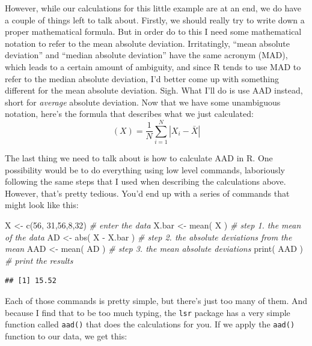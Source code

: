 \documentclass[
]{book}
\newenvironment{Shaded}{\begin{snugshade}}{\end{snugshade}}
\newcommand{\CommentTok}[1]{\textcolor[rgb]{0.56,0.35,0.01}{\textit{#1}}}
\newcommand{\DecValTok}[1]{\textcolor[rgb]{0.00,0.00,0.81}{#1}}
\newcommand{\FunctionTok}[1]{\textcolor[rgb]{0.00,0.00,0.00}{#1}}
\newcommand{\NormalTok}[1]{#1}
\newcommand{\OtherTok}[1]{\textcolor[rgb]{0.56,0.35,0.01}{#1}}
\newcommand{\SpecialCharTok}[1]{\textcolor[rgb]{0.00,0.00,0.00}{#1}}
\begin{document}
However, while our calculations for this little example are at an end, we do have a couple of things left to talk about. Firstly, we should really try to write down a proper mathematical formula. But in order do to this I need some mathematical notation to refer to the mean absolute deviation. Irritatingly, ``mean absolute deviation'' and ``median absolute deviation'' have the same acronym (MAD), which leads to a certain amount of ambiguity, and since R tends to use MAD to refer to the median absolute deviation, I'd better come up with something different for the mean absolute deviation. Sigh. What I'll do is use AAD instead, short for \emph{average} absolute deviation. Now that we have some unambiguous notation, here's the formula that describes what we just calculated:
\[
\mbox{}(X) = \frac{1}{N} \sum_{i = 1}^N |X_i - \bar{X}|
\]

The last thing we need to talk about is how to calculate AAD in R. One possibility would be to do everything using low level commands, laboriously following the same steps that I used when describing the calculations above. However, that's pretty tedious. You'd end up with a series of commands that might look like this:

\begin{Shaded}
\begin{Highlighting}[]
\NormalTok{X }\OtherTok{\textless{}{-}} \FunctionTok{c}\NormalTok{(}\DecValTok{56}\NormalTok{, }\DecValTok{31}\NormalTok{,}\DecValTok{56}\NormalTok{,}\DecValTok{8}\NormalTok{,}\DecValTok{32}\NormalTok{)   }\CommentTok{\# enter the data}
\NormalTok{X.bar }\OtherTok{\textless{}{-}} \FunctionTok{mean}\NormalTok{( X )       }\CommentTok{\# step 1. the mean of the data}
\NormalTok{AD }\OtherTok{\textless{}{-}} \FunctionTok{abs}\NormalTok{( X }\SpecialCharTok{{-}}\NormalTok{ X.bar )   }\CommentTok{\# step 2. the absolute deviations from the mean}
\NormalTok{AAD }\OtherTok{\textless{}{-}} \FunctionTok{mean}\NormalTok{( AD )        }\CommentTok{\# step 3. the mean absolute deviations}
\FunctionTok{print}\NormalTok{( AAD )             }\CommentTok{\# print the results}
\end{Highlighting}
\end{Shaded}

\begin{verbatim}
## [1] 15.52
\end{verbatim}

Each of those commands is pretty simple, but there's just too many of them. And because I find that to be too much typing, the \texttt{lsr} package has a very simple function called \texttt{aad()} that does the calculations for you. If we apply the \texttt{aad()} function to our data, we get this:
\end{document}
